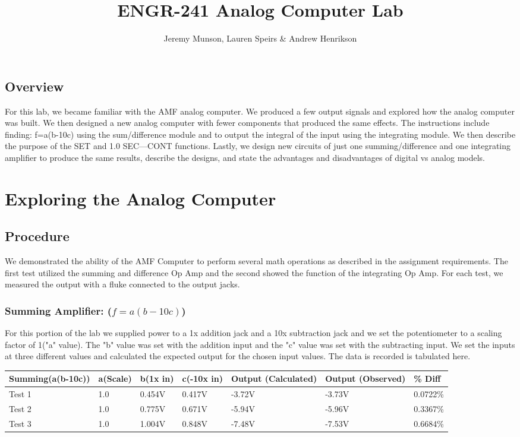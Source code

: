 \documentclass[11pt]{article}
\title{ENGR-241 Analog Computer Lab}
\author{Jeremy Munson, Lauren Speirs \& Andrew Henrikson}
\begin{document}
	\maketitle
	\subsection*{Overview}
	For this lab, we became familiar with the AMF analog computer. We produced a few output signals and explored how the analog computer was built. We then designed a new analog computer with fewer components that produced the same effects. The instructions include finding: f=a(b-10c) using the sum/difference module and to output the integral of the input using the integrating module. We then describe the purpose of the SET and 1.0 SEC---CONT functions. Lastly, we design new circuits of just one summing/difference and one integrating amplifier to produce the same results, describe the designs, and state the advantages and disadvantages of digital vs analog models. 
	\section*{Exploring the Analog Computer}
	
	\subsection*{Procedure}
	We demonstrated the ability of the AMF Computer to perform several math operations as described in the assignment requirements. The first test utilized the summing and difference Op Amp and the second showed the function of the integrating Op Amp. For each test, we measured the output with a fluke connected to the output jacks.
	
	\subsubsection*{Summing Amplifier: ($f=a(b-10c)$)}
	For this portion of the lab we supplied power to a 1x addition jack and a 10x subtraction jack and we set the potentiometer to a scaling factor of 1("a" value). The "b" value was set with the addition input and the "c" value was set with the subtracting input. We set the inputs at three different values and calculated the expected output for the chosen input values. The data is recorded is tabulated here.
	\begin{table}[h]
		\def\arraystretch{1.2}%
		\begin{tabular}{|l|l|l|l|l|l|l|}
			\hline
			Summing(a(b-10c))	& a(Scale) 		& b(1x in)	& c(-10x in)	& Output (Calculated)		& Output (Observed) 	& \% Diff				\\ \hline
			Test 1				& 1.0			& 0.454V	& 0.417V		& -3.72V					& -3.73V				&0.0722\%				\\ \hline
			Test 2				& 1.0			& 0.775V	& 0.671V		& -5.94V					& -5.96V				&0.3367\%				\\ \hline
			Test 3				& 1.0			& 1.004V	& 0.848V		& -7.48V					& -7.53V				&0.6684\%				\\ \hline
		\end{tabular}
	\end{table}
	
\end{document}
